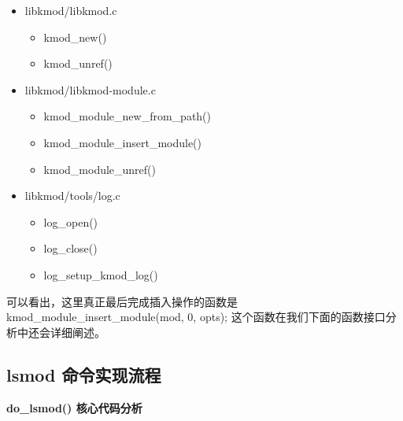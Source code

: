\begin{itemize}
\item
  libkmod/libkmod.c
  \begin{itemize}
  \item
    kmod\_new()
  \item
    kmod\_unref()
  \end{itemize}
\item
  libkmod/libkmod-module.c
  \begin{itemize}
  \item
    kmod\_module\_new\_from\_path()
  \item
    kmod\_module\_insert\_module()
  \item
    kmod\_module\_unref()
  \end{itemize}
\item
  libkmod/tools/log.c
  \begin{itemize}
  \item
    log\_open()
  \item
    log\_close()
  \item
    log\_setup\_kmod\_log()
  \end{itemize}
\end{itemize}
可以看出，这里真正最后完成插入操作的函数是
kmod\_module\_insert\_module(mod, 0, opts);
这个函数在我们下面的函数接口分析中还会详细阐述。

\subsection{lsmod 命令实现流程}

\textbf{do\_lsmod() 核心代码分析}

